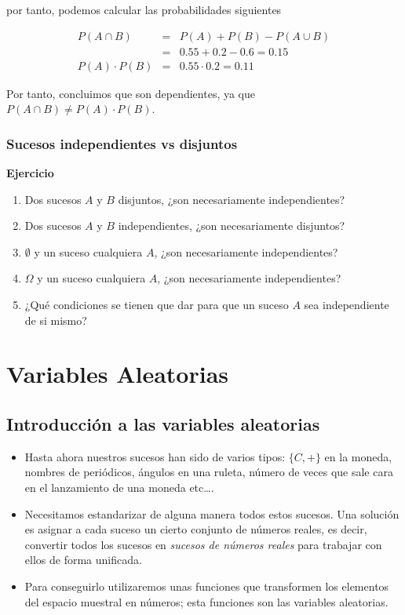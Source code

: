 \documentclass[]{book}
\providecommand{\tightlist}{%
  \setlength{\itemsep}{0pt}\setlength{\parskip}{0pt}}
\begin{document}
por tanto, podemos calcular las probabilidades siguientes

\begin{eqnarray*}
P(A\cap B) & = &P(A)+P(B)-P(A\cup B)\\ 
& = &0.55+0.2-0.6=0.15\\ 
P(A)\cdot P(B) & = & 0.55\cdot 0.2=0.11
\end{eqnarray*}

Por tanto, concluimos que son dependientes, ya que \(P(A\cap B)\neq P(A)\cdot P(B)\).

\hypertarget{sucesos-independientes-vs-disjuntos}{%
\subsection{Sucesos independientes vs disjuntos}\label{sucesos-independientes-vs-disjuntos}}

\textbf{Ejercicio}

\begin{enumerate}
\def\labelenumi{\arabic{enumi}.}
\tightlist
\item
  Dos sucesos \(A\) y \(B\) disjuntos, ¿son necesariamente independientes?
\item
  Dos sucesos \(A\) y \(B\) independientes, ¿son necesariamente disjuntos?
\item
  \(\emptyset\) y un suceso cualquiera \(A\), ¿son necesariamente independientes?
\item
  \(\Omega\) y un suceso cualquiera \(A\), ¿son necesariamente independientes?
\item
  ¿Qué condiciones se tienen que dar para que un suceso \(A\) sea independiente de si mismo?
\end{enumerate}

\hypertarget{variables-aleatorias}{%
\chapter{Variables Aleatorias}\label{variables-aleatorias}}

\hypertarget{introducciuxf3n-a-las-variables-aleatorias}{%
\section{Introducción a las variables aleatorias}\label{introducciuxf3n-a-las-variables-aleatorias}}

\begin{itemize}
\tightlist
\item
  Hasta ahora nuestros sucesos han sido de varios tipos: \(\{C,+\}\) en
  la moneda, nombres de periódicos, ángulos en una ruleta, número de
  veces que sale cara en el lanzamiento de una moneda etc\ldots.
\item
  Necesitamos estandarizar de alguna manera todos estos sucesos. Una
  solución es asignar a cada suceso un cierto conjunto de
  números reales, es decir, convertir todos los sucesos en
  \emph{sucesos de números reales} para trabajar con ellos de forma
  unificada.
\item
  Para conseguirlo utilizaremos unas funciones que
  transformen los elementos del espacio muestral en números; esta funciones son las
  variables aleatorias.
\end{itemize}
\end{document}

